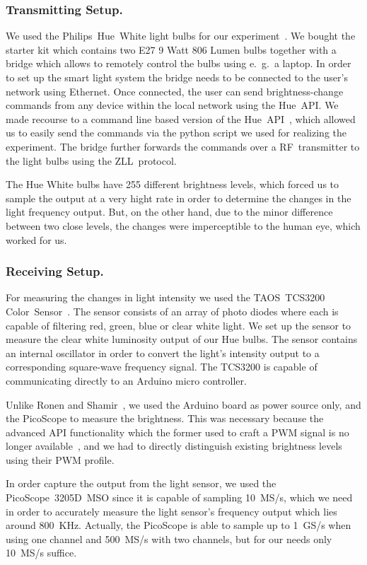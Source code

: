 \subsubsection{Transmitting Setup.} We used the Philips~Hue~White light bulbs for our experiment~\cite{Philips:2018:Hue}. We bought the starter kit which contains two E27 9 Watt 806 Lumen bulbs together with a bridge which allows to remotely control the bulbs using e.~g.\ a laptop. In order to set up the smart light system the bridge needs to be connected to the user's network using Ethernet. Once connected, the user can send brightness-change commands from any device within the local network using the Hue~API. We made recourse to a command line based version of the Hue~API~\cite{Bahamas10:2018:HueApi}, which allowed us to easily send the commands via the python script we used for realizing the experiment. The bridge further forwards the commands over a RF~transmitter to the light bulbs using the ZLL~protocol.

The Hue White bulbs have 255 different brightness levels, which forced us to sample the output at a very hight rate in order to determine the changes in the light frequency output. But, on the other hand, due to the minor difference between two close levels, the changes were imperceptible to the human eye, which worked for us.

\subsubsection{Receiving Setup.} For measuring the changes in light intensity we used the TAOS~TCS3200 Color~Sensor~\cite{DFRobot:2018:Sensor}. The sensor consists of an array of photo diodes where each is capable of filtering red, green, blue or clear white light. We set up the sensor to measure the clear white luminosity output of our Hue bulbs. The sensor contains an internal oscillator in order to convert the light's intensity output to a corresponding square-wave frequency signal. The TCS3200 is capable of communicating directly to an Arduino micro controller.

Unlike Ronen and Shamir~\cite{Ronen:2016:EFAIDCSL}, we used the Arduino board as power source only, and the PicoScope to measure the brightness. This was necessary because the advanced API functionality which the former used to craft a PWM signal is no longer available~\cite{Ronen:2016:EFAIDCSL}, and we had to directly distinguish existing brightness levels using their PWM profile.

In order capture the output from the light sensor, we used the PicoScope~3205D~MSO since it is capable of sampling 10~MS/s, which we need in order to accurately measure the light sensor's frequency output which lies around 800~KHz. Actually, the PicoScope is able to sample up to 1~GS/s when using one channel and 500~MS/s with two channels, but for our needs only 10~MS/s suffice.

